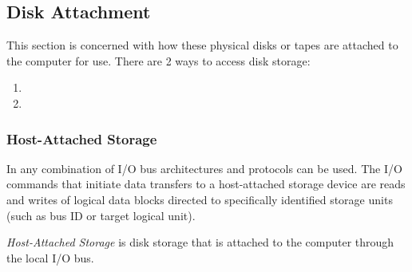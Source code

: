 \subsection{Disk Attachment}\label{subsec:Disk_Attachment}
This section is concerned with how these physical disks or tapes are attached to the computer for use.
There are 2 ways to access disk storage:
\begin{enumerate}[noitemsep]
\item {}
\item {}
\end{enumerate}

\subsubsection{Host-Attached Storage}\label{subsubsec:Host_Attached_Storage}
In  any combination of I/O bus architectures and protocols can be used.
The I/O commands that initiate data transfers to a host-attached storage device are reads and writes of logical data blocks directed to specifically identified storage units (such as bus ID or target logical unit).

\begin{definition}\label{def:Host_Attached_Storage}
  \emph{Host-Attached Storage} is disk storage that is attached to the computer through the local I/O bus.
\end{definition}


